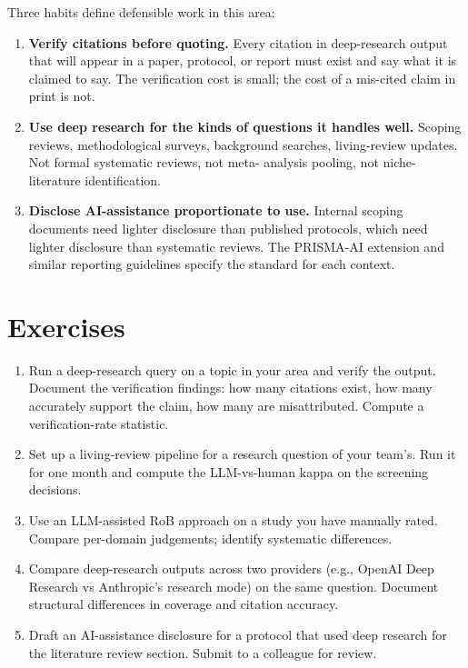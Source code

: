 \documentclass[
  letterpaper,
  11pt]{scrbook}
\begin{document}
Three habits define defensible work in this area:

\begin{enumerate}
\def\labelenumi{\arabic{enumi}.}
\item
  \textbf{Verify citations before quoting.} Every citation in
  deep-research output that will appear in a paper, protocol, or report
  must exist and say what it is claimed to say. The verification cost is
  small; the cost of a mis-cited claim in print is not.
\item
  \textbf{Use deep research for the kinds of questions it handles well.}
  Scoping reviews, methodological surveys, background searches,
  living-review updates. Not formal systematic reviews, not meta-
  analysis pooling, not niche-literature identification.
\item
  \textbf{Disclose AI-assistance proportionate to use.} Internal scoping
  documents need lighter disclosure than published protocols, which need
  lighter disclosure than systematic reviews. The PRISMA-AI extension
  and similar reporting guidelines specify the standard for each
  context.
\end{enumerate}

\section{Exercises}\label{exercises-8}

\begin{enumerate}
\def\labelenumi{\arabic{enumi}.}
\item
  Run a deep-research query on a topic in your area and verify the
  output. Document the verification findings: how many citations exist,
  how many accurately support the claim, how many are misattributed.
  Compute a verification-rate statistic.
\item
  Set up a living-review pipeline for a research question of your
  team's. Run it for one month and compute the LLM-vs-human kappa on the
  screening decisions.
\item
  Use an LLM-assisted RoB approach on a study you have manually rated.
  Compare per-domain judgements; identify systematic differences.
\item
  Compare deep-research outputs across two providers (e.g., OpenAI Deep
  Research vs Anthropic's research mode) on the same question. Document
  structural differences in coverage and citation accuracy.
\item
  Draft an AI-assistance disclosure for a protocol that used deep
  research for the literature review section. Submit to a colleague for
  review.
\end{enumerate}
\end{document}
